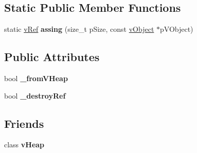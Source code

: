 \subsection*{Static Public Member Functions}
\begin{DoxyCompactItemize}
\item 
\hypertarget{classv_ref_aa3ac4bab0c6cea635768dbfe40dc1284}{static \hyperlink{classv_ref}{v\-Ref} {\bfseries assing} (size\-\_\-t p\-Size, const \hyperlink{classv_object}{v\-Object} $\ast$p\-V\-Object)}\label{classv_ref_aa3ac4bab0c6cea635768dbfe40dc1284}

\end{DoxyCompactItemize}
\subsection*{Public Attributes}
\begin{DoxyCompactItemize}
\item 
\hypertarget{classv_ref_aaf5d33821d373d8b68daa73b00969c2c}{bool {\bfseries \-\_\-from\-V\-Heap}}\label{classv_ref_aaf5d33821d373d8b68daa73b00969c2c}

\item 
\hypertarget{classv_ref_a3f8a845f0e4623d38404e67ff51d8c5c}{bool {\bfseries \-\_\-destroy\-Ref}}\label{classv_ref_a3f8a845f0e4623d38404e67ff51d8c5c}

\end{DoxyCompactItemize}
\subsection*{Friends}
\begin{DoxyCompactItemize}
\item 
\hypertarget{classv_ref_ad615cc5888405061e930d41dba53d277}{class {\bfseries v\-Heap}}\label{classv_ref_ad615cc5888405061e930d41dba53d277}

\end{DoxyCompactItemize}


